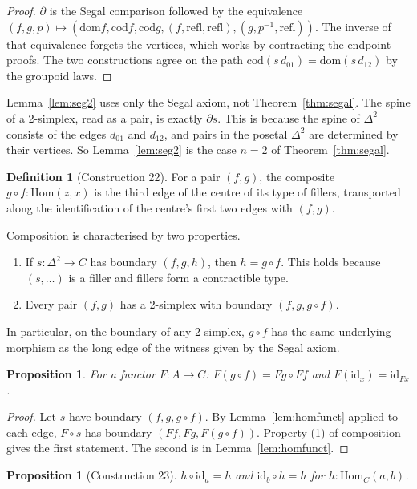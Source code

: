 \documentclass[11pt]{amsart}
\numberwithin{equation}{section}
\newtheorem{proposition}[theorem]{Proposition}
\theoremstyle{definition}
\newtheorem{definition}[theorem]{Definition}
\theoremstyle{remark}
\newcommand{\Hom}{\mathrm{Hom}}
\newcommand{\dom}{\mathrm{dom}}
\newcommand{\cod}{\mathrm{cod}}
\newcommand{\id}{\mathrm{id}}
\begin{document}
\begin{proof}
$\partial$ is the Segal comparison followed by the equivalence
$(f,g,p)\mapsto(\dom f,\cod f,\cod g,(f,\mathrm{refl},\mathrm{refl}),
(g,p^{-1},\mathrm{refl}))$. The inverse of that equivalence forgets the
vertices, which works by contracting the endpoint proofs. The two
constructions agree on the path $\cod(s\,d_{01})=\dom(s\,d_{12})$ by
the groupoid laws.
\end{proof}

Lemma~\ref{lem:seg2} uses only the Segal axiom, not
Theorem~\ref{thm:segal}. The spine of a 2-simplex, read as a pair, is
exactly $\partial s$. This is because the spine of $\Delta^2$ consists
of the edges $d_{01}$ and $d_{12}$, and pairs in the posetal $\Delta^2$
are determined by their vertices. So Lemma~\ref{lem:seg2} is the case
$n=2$ of Theorem~\ref{thm:segal}.

\begin{definition}[Construction 22]
For a pair $(f,g)$, the composite $g\circ f:\Hom(z,x)$ is the third
edge of the centre of its type of fillers, transported along the
identification of the centre's first two edges with $(f,g)$.
\end{definition}

Composition is characterised by two properties.
\begin{enumerate}
\item If $s:\Delta^2\to C$ has boundary $(f,g,h)$, then $h=g\circ f$.
  This holds because $(s,\ldots)$ is a filler and fillers form a
  contractible type.
\item Every pair $(f,g)$ has a 2-simplex with boundary
  $(f,g,g\circ f)$.
\end{enumerate}
In particular, on the boundary of any 2-simplex, $g\circ f$ has the
same underlying morphism as the long edge of the witness given by the
Segal axiom.

\begin{proposition}\label{prop:funct}
For a functor $F:A\to C$: $F(g\circ f)=Fg\circ Ff$ and $F(\id_x)=\id_{Fx}$.
\end{proposition}

\begin{proof}
Let $s$ have boundary $(f,g,g\circ f)$. By Lemma~\ref{lem:homfunct}
applied to each edge, $F\circ s$ has boundary $(Ff,Fg,F(g\circ f))$.
Property (1) of composition gives the first statement. The second is
in Lemma~\ref{lem:homfunct}.
\end{proof}

\begin{proposition}[Construction 23]
$h\circ\id_a=h$ and $\id_b\circ h=h$ for $h:\Hom_C(a,b)$.
\end{proposition}
\end{document}

